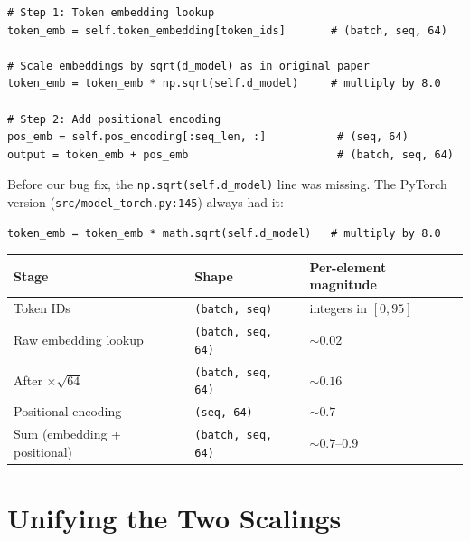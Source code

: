 \documentclass[11pt, a4paper]{article}
\begin{document}
\begin{application}
\begin{verbatim}
# Step 1: Token embedding lookup
token_emb = self.token_embedding[token_ids]       # (batch, seq, 64)

# Scale embeddings by sqrt(d_model) as in original paper
token_emb = token_emb * np.sqrt(self.d_model)     # multiply by 8.0

# Step 2: Add positional encoding
pos_emb = self.pos_encoding[:seq_len, :]           # (seq, 64)
output = token_emb + pos_emb                       # (batch, seq, 64)
\end{verbatim}

\noindent Before our bug fix, the \texttt{np.sqrt(self.d\_model)} line was missing.
The PyTorch version (\texttt{src/model\_torch.py:145}) always had it:
\begin{verbatim}
token_emb = token_emb * math.sqrt(self.d_model)   # multiply by 8.0
\end{verbatim}
\end{application}

\begin{dimcheck}
\begin{tabular}{lll}
\toprule
\textbf{Stage} & \textbf{Shape} & \textbf{Per-element magnitude} \\
\midrule
Token IDs & \texttt{(batch, seq)} & integers in $[0, 95]$ \\
Raw embedding lookup & \texttt{(batch, seq, 64)} & $\sim 0.02$ \\
After $\times \sqrt{64}$ & \texttt{(batch, seq, 64)} & $\sim 0.16$ \\
Positional encoding & \texttt{(seq, 64)} & $\sim 0.7$ \\
Sum (embedding + positional) & \texttt{(batch, seq, 64)} & $\sim 0.7$--$0.9$ \\
\bottomrule
\end{tabular}
\end{dimcheck}


\section{Unifying the Two Scalings}
\end{document}
